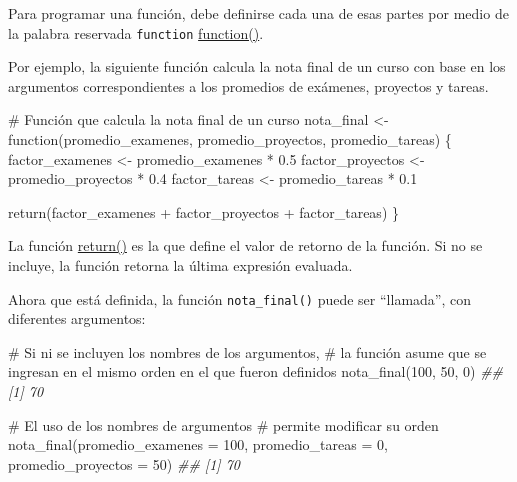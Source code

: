 \documentclass[
  letterpaper,
  DIV=11,
  numbers=noendperiod]{scrreprt}
\newenvironment{Shaded}{\begin{snugshade}}{\end{snugshade}}
\newcommand{\AttributeTok}[1]{\textcolor[rgb]{0.40,0.45,0.13}{#1}}
\newcommand{\CommentTok}[1]{\textcolor[rgb]{0.37,0.37,0.37}{#1}}
\newcommand{\ControlFlowTok}[1]{\textcolor[rgb]{0.00,0.23,0.31}{#1}}
\newcommand{\DecValTok}[1]{\textcolor[rgb]{0.68,0.00,0.00}{#1}}
\newcommand{\DocumentationTok}[1]{\textcolor[rgb]{0.37,0.37,0.37}{\textit{#1}}}
\newcommand{\FloatTok}[1]{\textcolor[rgb]{0.68,0.00,0.00}{#1}}
\newcommand{\FunctionTok}[1]{\textcolor[rgb]{0.28,0.35,0.67}{#1}}
\newcommand{\NormalTok}[1]{\textcolor[rgb]{0.00,0.23,0.31}{#1}}
\newcommand{\OtherTok}[1]{\textcolor[rgb]{0.00,0.23,0.31}{#1}}
\newcommand{\SpecialCharTok}[1]{\textcolor[rgb]{0.37,0.37,0.37}{#1}}
\begin{document}
Para programar una función, debe definirse cada una de esas partes por
medio de la palabra reservada \texttt{function}
\href{https://rdrr.io/r/base/function.html}{function()}.

Por ejemplo, la siguiente función calcula la nota final de un curso con
base en los argumentos correspondientes a los promedios de exámenes,
proyectos y tareas.

\begin{Shaded}
\begin{Highlighting}[]
\CommentTok{\# Función que calcula la nota final de un curso}
\NormalTok{nota\_final }\OtherTok{\textless{}{-}} \ControlFlowTok{function}\NormalTok{(promedio\_examenes,}
\NormalTok{                       promedio\_proyectos,}
\NormalTok{                       promedio\_tareas) \{}
\NormalTok{  factor\_examenes }\OtherTok{\textless{}{-}}\NormalTok{ promedio\_examenes }\SpecialCharTok{*} \FloatTok{0.5}
\NormalTok{  factor\_proyectos }\OtherTok{\textless{}{-}}\NormalTok{ promedio\_proyectos }\SpecialCharTok{*} \FloatTok{0.4}
\NormalTok{  factor\_tareas }\OtherTok{\textless{}{-}}\NormalTok{ promedio\_tareas }\SpecialCharTok{*} \FloatTok{0.1}
  
  \FunctionTok{return}\NormalTok{(factor\_examenes }\SpecialCharTok{+}\NormalTok{ factor\_proyectos }\SpecialCharTok{+}\NormalTok{ factor\_tareas)}
\NormalTok{\}}
\end{Highlighting}
\end{Shaded}

La función \href{https://rdrr.io/r/base/function.html}{return()} es la
que define el valor de retorno de la función. Si no se incluye, la
función retorna la última expresión evaluada.

Ahora que está definida, la función \texttt{nota\_final()} puede ser
``llamada'', con diferentes argumentos:

\begin{Shaded}
\begin{Highlighting}[]
\CommentTok{\# Si ni se incluyen los nombres de los argumentos, }
\CommentTok{\# la función asume que se ingresan en el mismo orden en el que fueron definidos}
\FunctionTok{nota\_final}\NormalTok{(}\DecValTok{100}\NormalTok{, }\DecValTok{50}\NormalTok{, }\DecValTok{0}\NormalTok{)}
\DocumentationTok{\#\# [1] 70}

\CommentTok{\# El uso de los nombres de argumentos }
\CommentTok{\# permite modificar su orden}
\FunctionTok{nota\_final}\NormalTok{(}\AttributeTok{promedio\_examenes =}  \DecValTok{100}\NormalTok{, }\AttributeTok{promedio\_tareas =}  \DecValTok{0}\NormalTok{, }\AttributeTok{promedio\_proyectos =} \DecValTok{50}\NormalTok{)}
\DocumentationTok{\#\# [1] 70}
\end{Highlighting}
\end{Shaded}
\end{document}
